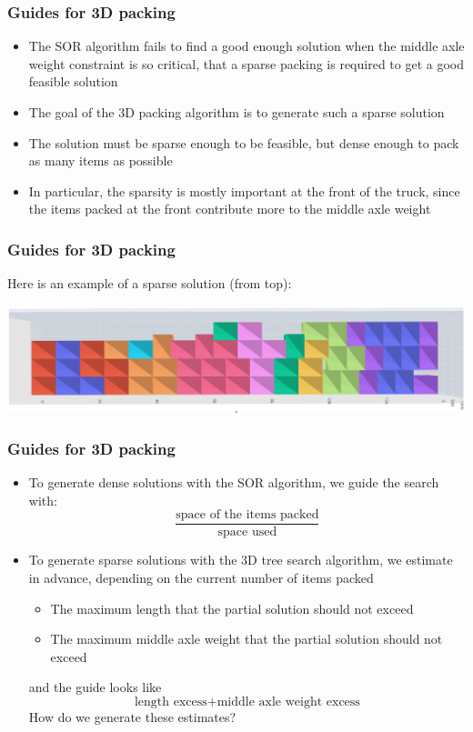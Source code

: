 \documentclass[10pt]{beamer}
\begin{document}
\begin{frame}
  \frametitle{Guides for 3D packing}
  
  \begin{itemize}
    \item The SOR algorithm fails to find a good enough solution when the middle axle weight constraint is so critical, that a \alert{sparse} packing is required to get a good feasible solution
    \item The goal of the 3D packing algorithm is to generate such a sparse solution
    \item The solution must be sparse enough to be feasible, but dense enough to pack as many items as possible
    \item In particular, the sparsity is mostly important at the front of the truck, since the items packed at the front contribute more to the middle axle weight
  \end{itemize}
\end{frame}
\begin{frame}
  \frametitle{Guides for 3D packing}

  Here is an example of a sparse solution (from top):
  \begin{center}
    \includegraphics[width=\textwidth]{img/3d_packing_solution.png}
  \end{center}

\end{frame}
\begin{frame}
  \frametitle{Guides for 3D packing}
  
  \begin{itemize}
    \item To generate dense solutions with the SOR algorithm, we guide the search with:
      \begin{displaymath}
        \frac{\text{space of the items packed}}{\text{space used}}
      \end{displaymath}
    \item To generate sparse solutions with the 3D tree search algorithm, we estimate in advance, depending on the current number of items packed
      \begin{itemize}
        \item The maximum length that the partial solution should not exceed
        \item The maximum middle axle weight that the partial solution should not exceed
      \end{itemize}
      and the guide looks like
      \begin{displaymath}
        \text{length excess} + \text{middle axle weight excess}
      \end{displaymath}
      How do we generate these estimates?
  \end{itemize}
\end{frame}
\end{document}
